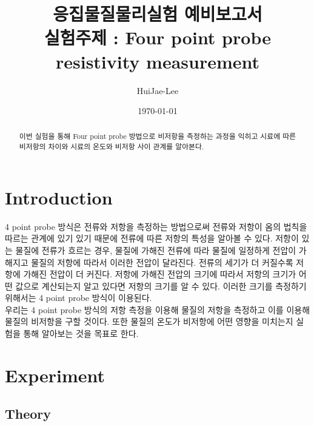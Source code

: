 \documentclass[aps,reprint,superscriptaddress,10pt]{revtex4-2}
\begin{document}
\title{응집물질물리실험 예비보고서 \\
\small 실험주제 : Four point probe resistivity measurement}

\author{HuiJae-Lee}


\date{\today}


\begin{abstract}
    이번 실험을 통해 Four point probe 방법으로 비저항을 측정하는 과정을 익히고 
    시료에 따른 비저항의 차이와 시료의 온도와 비저항 사이 관계를 알아본다.
\end{abstract}
 
 \maketitle
 
\section[Introduction]{Introduction}
4 point probe 방식은 전류와 저항을 측정하는 방법으로써 전류와 저항이 옴의 법칙을 따르는
관계에 있기 있기 때문에 전류에 따른 저항의 특성을 알아볼 수 있다.
저항이 있는 물질에 전류가 흐르는 경우, 물질에 가해진 전류에 따라 물질에 일정하게 전압이 
가해지고 물질의 저항에 따라서 이러한 전압이 달라진다. 전류의 세기가 더 커질수록 저항에 
가해진 전압이 더 커진다. 저항에 가해진 전압의 크기에 따라서 저항의 크기가 어떤 값으로 
계산되는지 알고 있다면 저항의 크기를 알 수 있다. 이러한 크기를 측정하기 위해서는 4 point 
probe 방식이 이용된다. \\
우리는 4 point probe 방식의 저항 측정을 이용해 물질의 저항을 측정하고 이를 이용해 물질의 
비저항을 구할 것이다. 또한 물질의 온도가 비저항에 어떤 영향을 미치는지 실험을 통해
알아보는 것을 목표로 한다.

\section{Experiment}

\subsection{Theory}
\end{document}
